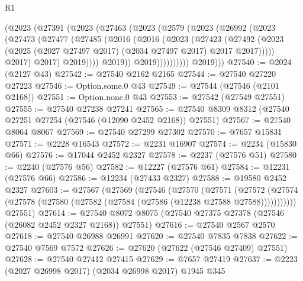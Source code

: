 \begin{lexlean}{R1}
\begin{coremodule}
                  (@2023
                    (@27391
                      (@2023
                        (@27463
                          (@2023
                            (@2579
                              (@2023
                                (@26992
                                  (@2023
                                    (@27473
                                      (@27477
                                        (@27485
                                          (@2016
                                            (@2016
                                              (@2023
                                                (@27423
                                                  (@27492
                                                    (@2023
                                                      (@2025
                                                        (@2027 @27497 @2017)
                                                        (@2034 @27497 @2017)
                                                        @2017
                                                        @2017)))))
                                              @2017)
                                            @2017)
                                          @2019))))
                                  @2019))
                              @2019))))))))))
          @2019)))
@27540 := @2024 (@2127 @43)
@27542 := @27540 @2162 @2165
@27544 := @27540 @27220 @27223
@27546 := Option.some.{0} @43
@27549 := @27544 (@27546 (@2101 @2168))
@27551 := Option.none.{0} @43
@27553 := @27542 (@27549 @27551)
@27555 := @27540 @27238 @27241
@27565 := @27540 @8309 @8312 (@27540 @27251 @27254 (@27546 (@12090 @2452 @2168)) @27551)
@27567 := @27540 @8064 @8067
@27569 := @27540 @27299 @27302
@27570 := @7657 @15831
@27571 := @2228 @16543
@27572 := @2231 @16907
@27574 := @2234 (@15830 @66)
@27576 := @17044 @2452 @2327
@27578 := @2237 (@27576 @51)
@27580 := @2240 (@27576 @56)
@27582 := @12227 (@27576 @61)
@27584 := @12231 (@27576 @66)
@27586 := @12234 (@27433 @2327)
@27588 := @19580 @2452 @2327
@27603 := @27567
    (@27569
      (@27546
        (@27570
          (@27571
            (@27572 (@27574 (@27578 (@27580 (@27582 (@27584 (@27586 (@12238 @27588 @27588)))))))))))
      @27551)
@27614 := @27540 @8072 @8075 (@27540 @27375 @27378 (@27546 (@26082 @2452 @2327 @2168)) @27551)
@27616 := @27540 @2567 @2570
@27618 := @27540 @26988 @26991
@27620 := @27540 @7835 @7838
@27622 := @27540 @7569 @7572
@27626 := @27620 (@27622 (@27546 @27409) @27551)
@27628 := @27540 @27412 @27415
@27629 := @7657 @27419
@27637 := @2223 (@2027 @26998 @2017) (@2034 @26998 @2017) @1945 @345

\end{coremodule}
\end{lexlean}
